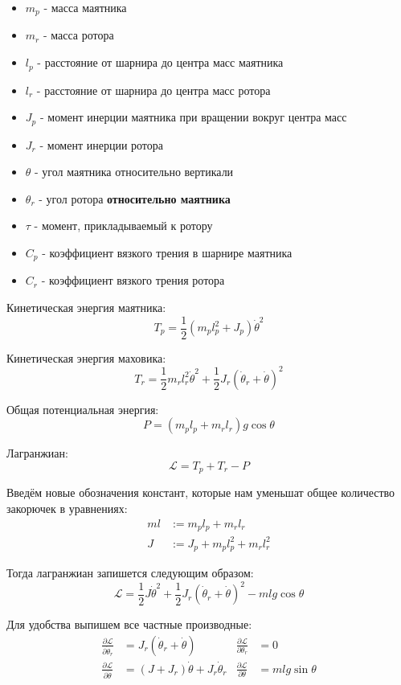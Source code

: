 \documentclass{article}
\begin{document}
\begin{minipage}[t]{.8\linewidth}
\vspace{0cm}
\begin{itemize}
    \item $m_p$ - масса маятника
    \item $m_r$ - масса ротора
    \item $l_p$ - расстояние от шарнира до центра масс маятника
    \item $l_r$ - расстояние от шарнира до центра масс ротора
    \item $J_p$ - момент инерции маятника при вращении вокруг центра масс
    \item $J_r$ - момент инерции ротора
    \item $\theta$ - угол маятника относительно вертикали
    \item $\theta_r$ - угол ротора \textbf{относительно маятника}
    \item $\tau$ - момент, прикладываемый к ротору
    \item $C_p$ - коэффициент вязкого трения в шарнире маятника
    \item $C_r$ - коэффициент вязкого трения ротора
\end{itemize}
\end{minipage}

\vspace{5mm}

Кинетическая энергия маятника:
$$
T_p = \frac{1}{2} (m_pl_p^2 + J_p)\dot\theta^2
$$

Кинетическая энергия маховика:
$$
T_r = \frac{1}{2} m_r l_r^2 \dot\theta^2 + \frac{1}{2}J_r (\dot\theta_r+\dot\theta)^2
$$

Общая потенциальная энергия:
$$
P = (m_pl_p + m_r l_r)g \cos\theta
$$

Лагранжиан:
$$
\mathcal{L} = T_p + T_r - P
$$

Введём новые обозначения констант, которые нам уменьшат общее количество закорючек в уравнениях:
\begin{align*}
ml&:=m_p l_p + m_r l_r\\
J &:= J_p + m_p l_p^2 + m_r l_r^2
\end{align*}

Тогда лагранжиан запишется следующим образом:
$$
\mathcal L = \frac{1}{2}J\dot\theta^2 + \frac{1}{2}J_r(\dot\theta_r+\dot\theta)^2 - mlg\cos\theta
$$

Для удобства выпишем все частные производные:
\begin{align*}
\frac{\partial\mathcal L}{\partial\dot\theta_r} &= J_r(\dot\theta_r + \dot\theta)       & \frac{\partial\mathcal L}{\partial\theta_r} &= 0            \\
\frac{\partial\mathcal L}{\partial\dot\theta}   &= (J+J_r)\dot\theta + J_r\dot\theta_r  & \frac{\partial\mathcal L}{\partial\theta}   &= mlg\sin\theta\\
\end{align*}
\end{document}
